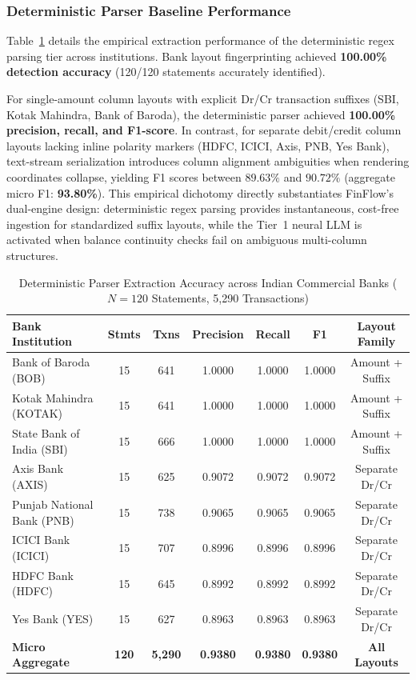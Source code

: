 \documentclass[conference]{IEEEtran}
\begin{document}
\subsubsection{Deterministic Parser Baseline Performance}
Table~\ref{tab:bank_bench} details the empirical extraction performance of the deterministic regex parsing tier across institutions. Bank layout fingerprinting achieved \textbf{100.00\% detection accuracy} (120/120 statements accurately identified). 

For single-amount column layouts with explicit Dr/Cr transaction suffixes (SBI, Kotak Mahindra, Bank of Baroda), the deterministic parser achieved \textbf{100.00\% precision, recall, and F1-score}. In contrast, for separate debit/credit column layouts lacking inline polarity markers (HDFC, ICICI, Axis, PNB, Yes Bank), text-stream serialization introduces column alignment ambiguities when rendering coordinates collapse, yielding F1 scores between $89.63\%$ and $90.72\%$ (aggregate micro F1: \textbf{93.80\%}). This empirical dichotomy directly substantiates FinFlow's dual-engine design: deterministic regex parsing provides instantaneous, cost-free ingestion for standardized suffix layouts, while the Tier~1 neural LLM is activated when balance continuity checks fail on ambiguous multi-column structures.

\begin{table}[t]
\caption{Deterministic Parser Extraction Accuracy across Indian Commercial Banks ($N=120$ Statements, 5,290 Transactions)}
\label{tab:bank_bench}
\centering
\begin{tabular}{lcccccc}
\toprule
\textbf{Bank Institution} & \textbf{Stmts} & \textbf{Txns} & \textbf{Precision} & \textbf{Recall} & \textbf{F1} & \textbf{Layout Family} \\
\midrule
Bank of Baroda (BOB) & 15 & 641 & 1.0000 & 1.0000 & 1.0000 & Amount + Suffix \\
Kotak Mahindra (KOTAK) & 15 & 641 & 1.0000 & 1.0000 & 1.0000 & Amount + Suffix \\
State Bank of India (SBI) & 15 & 666 & 1.0000 & 1.0000 & 1.0000 & Amount + Suffix \\
\midrule
Axis Bank (AXIS) & 15 & 625 & 0.9072 & 0.9072 & 0.9072 & Separate Dr/Cr \\
Punjab National Bank (PNB) & 15 & 738 & 0.9065 & 0.9065 & 0.9065 & Separate Dr/Cr \\
ICICI Bank (ICICI) & 15 & 707 & 0.8996 & 0.8996 & 0.8996 & Separate Dr/Cr \\
HDFC Bank (HDFC) & 15 & 645 & 0.8992 & 0.8992 & 0.8992 & Separate Dr/Cr \\
Yes Bank (YES) & 15 & 627 & 0.8963 & 0.8963 & 0.8963 & Separate Dr/Cr \\
\midrule
\textbf{Micro Aggregate} & \textbf{120} & \textbf{5,290} & \textbf{0.9380} & \textbf{0.9380} & \textbf{0.9380} & \textbf{All Layouts} \\
\bottomrule
\end{tabular}
\end{table}
\end{document}
